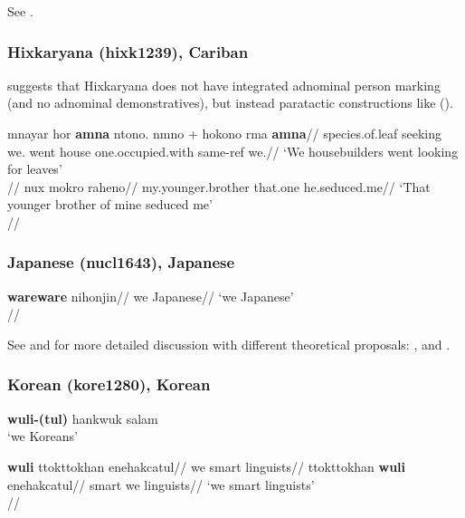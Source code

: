 See \citet[197, 199]{nedjalkov1997}.



\subsubsection{Hixkaryana (hixk1239), Cariban}

\citet[131]{derbyshire1979} suggests that Hixkaryana does not have integrated adnominal person marking (and no adnominal demonstratives), but instead paratactic constructions like (\nextx).

\pex
\a
\begingl
\gla m\textbari{}nayar\textbari{} hor\textbari{} \textbf{amna} ntono. n\textbari{}mno + hokono rma \textbf{amna}//
\glb species.of.leaf seeking we.\Excl{} went house {one.occupied.with} same-ref we.\Excl{}//
\glft `We housebuilders went looking for leaves'\\{\citep[131, (290)]{derbyshire1979}}//
\endgl
\a
\begingl
\gla nux mokro raheno//
\glb my.younger.brother that.one he.seduced.me//
\glft `That younger brother of mine seduced me'\\{\citep[132, (293a)]{derbyshire1979}}//
\endgl
\xe



\subsubsection{Japanese (nucl1643), Japanese} 

\ex \begingl
\gla \textbf{wareware} nihonjin//
\glb we Japanese//
\glft `we Japanese'\\\citep[254]{hinds1988}//
\endgl
\xe

See \citet[254, 261]{hinds1988} and for more detailed discussion with different theoretical proposals: \citet[780]{noguchi1997}, \citet[sec. 3.2]{furuya2008} and \citet{inokuma2009}.

\subsubsection{Korean (kore1280), Korean}


\ex \textbf{wuli-(tul)} hankwuk salam\\
 `we Koreans'\\
 \citep[292]{sohn1994}
 \xe
 
\pex
\a \begingl
\gla \textbf{wuli} ttokttokhan enehakcatul//
\glb we smart linguists//
\endgl
\a \begingl
\gla ttokttokhan \textbf{wuli} enehakcatul//
\glb smart we linguists//
\glft `we smart linguists'\\\citep[151, (15)]{choi2014phd}//
\endgl
\xe

